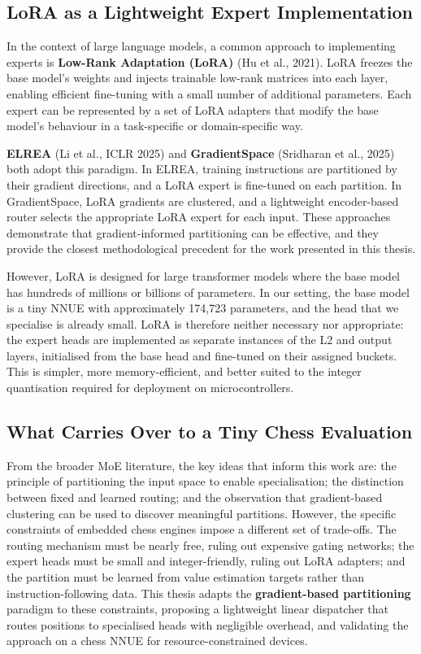 \subsection{LoRA as a Lightweight Expert Implementation}

In the context of large language models, a common approach to implementing experts is \textbf{Low-Rank Adaptation (LoRA)} (Hu et al., 2021). LoRA freezes the base model's weights and injects trainable low-rank matrices into each layer, enabling efficient fine-tuning with a small number of additional parameters. Each expert can be represented by a set of LoRA adapters that modify the base model's behaviour in a task-specific or domain-specific way.

\textbf{ELREA} (Li et al., ICLR 2025) and \textbf{GradientSpace} (Sridharan et al., 2025) both adopt this paradigm. In ELREA, training instructions are partitioned by their gradient directions, and a LoRA expert is fine-tuned on each partition. In GradientSpace, LoRA gradients are clustered, and a lightweight encoder-based router selects the appropriate LoRA expert for each input. These approaches demonstrate that gradient-informed partitioning can be effective, and they provide the closest methodological precedent for the work presented in this thesis.

However, LoRA is designed for large transformer models where the base model has hundreds of millions or billions of parameters. In our setting, the base model is a tiny NNUE with approximately 174{,}723 parameters, and the head that we specialise is already small. LoRA is therefore neither necessary nor appropriate: the expert heads are implemented as separate instances of the L2 and output layers, initialised from the base head and fine-tuned on their assigned buckets. This is simpler, more memory-efficient, and better suited to the integer quantisation required for deployment on microcontrollers.


\subsection{What Carries Over to a Tiny Chess Evaluation}

From the broader MoE literature, the key ideas that inform this work are: the principle of partitioning the input space to enable specialisation; the distinction between fixed and learned routing; and the observation that gradient-based clustering can be used to discover meaningful partitions. However, the specific constraints of embedded chess engines impose a different set of trade-offs. The routing mechanism must be nearly free, ruling out expensive gating networks; the expert heads must be small and integer-friendly, ruling out LoRA adapters; and the partition must be learned from value estimation targets rather than instruction-following data. This thesis adapts the \textbf{gradient-based partitioning} paradigm to these constraints, proposing a lightweight linear dispatcher that routes positions to specialised heads with negligible overhead, and validating the approach on a chess NNUE for resource-constrained devices.



